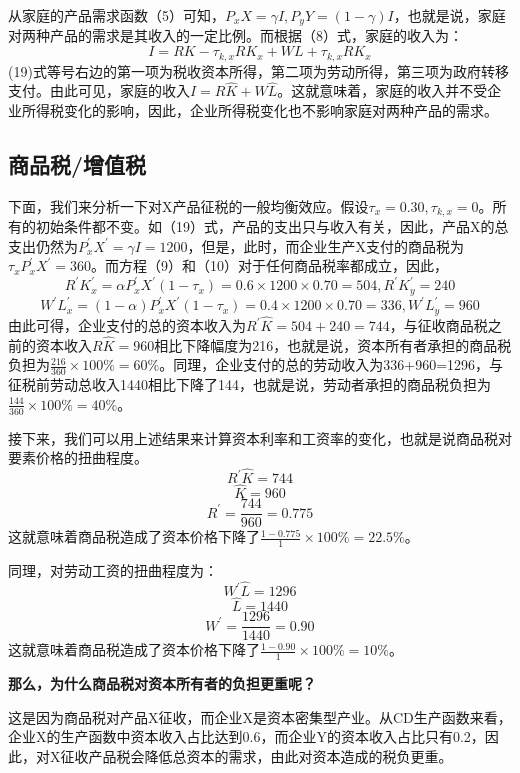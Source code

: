 \documentclass[cn,12pt,math=newtx,citestyle=gb7714-2015,bibstyle=gb7714-2015]{elegantbook}
\begin{document}
	从家庭的产品需求函数（5）可知，$P_xX=\gamma I,P_yY=(1-\gamma)I$，也就是说，家庭对两种产品的需求是其收入的一定比例。而根据（8）式，家庭的收入为：
	\begin{equation}
		I=RK-\tau_{k,x}RK_x+WL+\tau_{k,x}RK_x
	\end{equation}
	(19)式等号右边的第一项为税收资本所得，第二项为劳动所得，第三项为政府转移支付。由此可见，家庭的收入$I=R\hat{K}+W\hat{L}$。这就意味着，家庭的收入并不受企业所得税变化的影响，因此，企业所得税变化也不影响家庭对两种产品的需求。
	
	\subsection{商品税/增值税}
	下面，我们来分析一下对X产品征税的一般均衡效应。假设$\tau_x=0.30,\tau_{k,x}=0$。所有的初始条件都不变。如（19）式，产品的支出只与收入有关，因此，产品X的总支出仍然为$P_x^{'}X^{'}=\gamma I=1200$，但是，此时，而企业生产X支付的商品税为$\tau_xP_x^{'}X^{'}=360$。而方程（9）和（10）对于任何商品税率都成立，因此，
	\begin{equation}
		R^{'}K_x^{'}=\alpha P_x^{'}X^{'}(1-\tau_x)=0.6\times 1200 \times 0.70=504,R^{'}K_y^{'}=240
	\end{equation}
	\begin{equation}
		W^{'}L_x^{'}=(1-\alpha) P_x^{'}X^{'}(1-\tau_x)=0.4\times 1200 \times 0.70=336,W^{'}L_y^{'}=960
	\end{equation}
	由此可得，企业支付的总的资本收入为$R^{'}\hat{K}=504+240=744$，与征收商品税之前的资本收入$R\hat{K}=960$相比下降幅度为216，也就是说，资本所有者承担的商品税负担为$\frac{216}{360}\times 100\%=60\%$。同理，企业支付的总的劳动收入为336+960=1296，与征税前劳动总收入1440相比下降了144，也就是说，劳动者承担的商品税负担为$\frac{144}{360}\times 100\%=40\%$。
	
	接下来，我们可以用上述结果来计算资本利率和工资率的变化，也就是说商品税对要素价格的扭曲程度。
	$$R^{'}\hat{K}=744$$
	$$\hat{K}=960$$
	$$R^{'}=\frac{744}{960}=0.775$$
	这就意味着商品税造成了资本价格下降了$\frac{1-0.775}{1}\times 100\%=22.5\%$。
	
	同理，对劳动工资的扭曲程度为：
	$$W^{'}\hat{L}=1296$$
	$$\hat{L}=1440$$
	$$W^{'}=\frac{1296}{1440}=0.90$$
	这就意味着商品税造成了资本价格下降了$\frac{1-0.90}{1}\times 100\%=10\%$。
	
	\textbf{那么，为什么商品税对资本所有者的负担更重呢？}
	
	这是因为商品税对产品X征收，而企业X是资本密集型产业。从CD生产函数来看，企业X的生产函数中资本收入占比达到0.6，而企业Y的资本收入占比只有0.2，因此，对X征收产品税会降低总资本的需求，由此对资本造成的税负更重。
	
\end{document}
